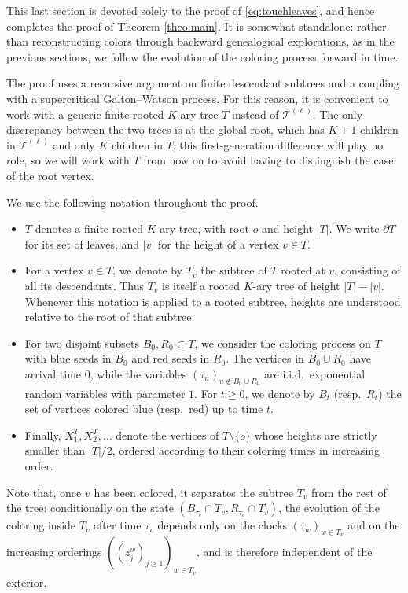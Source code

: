 \documentclass[french]{article}
\newcommand{\zi}{z}
\newcommand{\T}{\mathcal{T}}
\newcommand{\Tf}{T}
\renewcommand{\1}{\mathds{1}}
\begin{document}
This last section is devoted solely to the proof of \eqref{eq:touchleaves}, and hence completes the proof of Theorem \ref{theo:main}. It is somewhat standalone: rather than reconstructing colors through backward genealogical explorations, as in the previous sections, we follow the evolution of the coloring process forward in time. 
\medskip 

The proof uses a recursive argument on finite descendant subtrees and a coupling with a supercritical Galton--Watson process. For this reason, it is convenient to work with a generic finite rooted $K$-ary tree $\Tf$ instead of $\T^{(\ell)}$. The only discrepancy between the two trees is at the global root, which has $K+1$ children in $\T^{(\ell)}$ and only $K$ children in $\Tf$; this first-generation difference will play no role, so we will work with $\Tf$ from now on to avoid having to distinguish the case of the root vertex.
\medskip

\noindent We use the following notation throughout the proof.
\begin{itemize}
\item $\Tf$ denotes a finite rooted $K$-ary tree, with root $o$ and height $|\Tf|$. We write $\partial \Tf$ for its set of leaves, and $|v|$ for the height of a vertex $v\in \Tf$.


\item For a vertex $v\in \Tf$, we denote by $\Tf_v$ the subtree of $\Tf$ rooted at $v$, consisting of all its descendants. Thus $\Tf_v$ is itself a rooted $K$-ary tree of height $|\Tf|-|v|$. Whenever this notation is applied to a rooted subtree, heights are understood relative to the root of that subtree.

\item For two disjoint subsets $B_0,R_0\subset \Tf$, we consider the coloring process on $\Tf$ with blue seeds in $B_0$ and red seeds in $R_0$. The vertices in $B_0\cup R_0$ have arrival time $0$, while the variables $(\tau_u)_{u\notin B_0\cup R_0}$ are i.i.d.\ exponential random variables with parameter $1$. For $t \ge 0$, we denote by $B_t$ (resp.\ $R_t$) the set of vertices colored blue (resp.\ red) up to time $t$.

\item Finally, $X^{\Tf}_1,X^{\Tf}_2,\ldots$ denote the vertices of $\Tf\setminus\{o\}$ whose heights are strictly smaller than $|\Tf|/2$, ordered according to their coloring times in increasing order.
\end{itemize}
Note that, once $v$ has been colored, it separates the subtree $\Tf_v$ from the rest of the tree: conditionally on the state $(B_{\tau_v}\cap \Tf_v,R_{\tau_v}\cap \Tf_v)$, the evolution of the coloring inside $\Tf_v$ after time $\tau_v$ depends only on the clocks $(\tau_w)_{w\in \Tf_v}$ and on the increasing orderings $((\zi_j^w)_{j\ge 1})_{w\in \Tf_v}$, and is therefore independent of the exterior.
\end{document}
